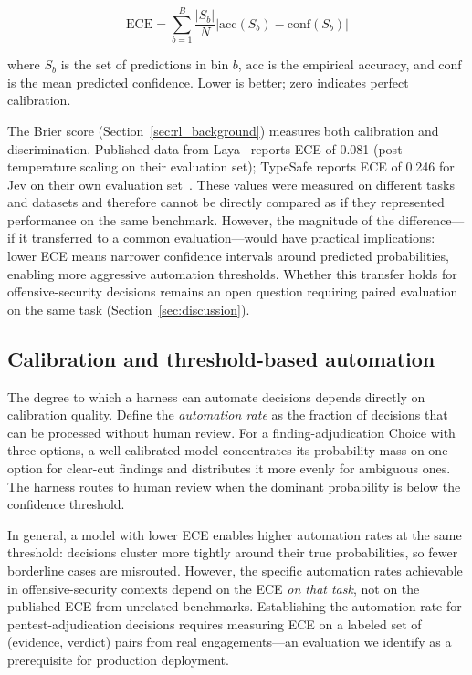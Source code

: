 \documentclass[conference]{IEEEtran}
\begin{document}
\begin{equation}
\mathrm{ECE} = \sum_{b=1}^{B} \frac{|S_b|}{N} \left| \mathrm{acc}(S_b) - \mathrm{conf}(S_b) \right|
\end{equation}

where $S_b$ is the set of predictions in bin $b$, $\mathrm{acc}$ is the empirical accuracy, and $\mathrm{conf}$ is the mean predicted confidence. Lower is better; zero indicates perfect calibration.

The Brier score (Section~\ref{sec:rl_background}) measures both calibration and discrimination. Published data from Laya~\cite{laya2026} reports ECE of 0.081 (post-temperature scaling on their evaluation set); TypeSafe reports ECE of 0.246 for Jev on their own evaluation set~\cite{typesafe2026docs}. These values were measured on different tasks and datasets and therefore cannot be directly compared as if they represented performance on the same benchmark. However, the magnitude of the difference---if it transferred to a common evaluation---would have practical implications: lower ECE means narrower confidence intervals around predicted probabilities, enabling more aggressive automation thresholds. Whether this transfer holds for offensive-security decisions remains an open question requiring paired evaluation on the same task (Section~\ref{sec:discussion}).

\subsection{Calibration and threshold-based automation}

The degree to which a harness can automate decisions depends directly on calibration quality. Define the \emph{automation rate} as the fraction of decisions that can be processed without human review. For a finding-adjudication Choice with three options, a well-calibrated model concentrates its probability mass on one option for clear-cut findings and distributes it more evenly for ambiguous ones. The harness routes to human review when the dominant probability is below the confidence threshold.

In general, a model with lower ECE enables higher automation rates at the same threshold: decisions cluster more tightly around their true probabilities, so fewer borderline cases are misrouted. However, the specific automation rates achievable in offensive-security contexts depend on the ECE \emph{on that task}, not on the published ECE from unrelated benchmarks. Establishing the automation rate for pentest-adjudication decisions requires measuring ECE on a labeled set of (evidence, verdict) pairs from real engagements---an evaluation we identify as a prerequisite for production deployment.
\end{document}
